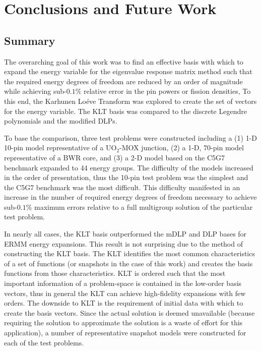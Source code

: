 
\chapter{Conclusions and Future Work} %

\label{Chapter7}



\section{Summary}

The overarching goal of this work was to find an effective basis 
with which to expand the energy variable for the eigenvalue response matrix 
method such that the required energy degrees of freedom are reduced by an order 
of magnitude while achieving sub-$0.1\%$ relative error in the pin powers or 
fission densities,  To this end, the Karhunen Lo\'{e}ve Transform was explored 
to create the set of vectors for the energy variable.  The KLT basis was 
compared to the discrete Legendre polynomials and the modified DLPs.  

To base the comparison, three test problems were constructed including a (1) 1-D 
10-pin model representative of a UO$_2$-MOX junction, (2) a 1-D, 70-pin model 
representative of a BWR core, and (3) a 2-D model based on the C5G7 benchmark 
expanded to 44 energy groups.  The difficulty of the models increased in the 
order of presentation, thus the 10-pin test problem was the simplest and the 
C5G7 benchmark was the most difficult.  This difficulty manifested in an 
increase in the number of required energy degrees of freedom necessary to 
achieve sub-$0.1\%$ maximum errors relative to a full multigroup solution of 
the particular test problem.

In nearly all cases, the KLT basis outperformed the mDLP and DLP bases for ERMM 
energy expansions.  This result is not surprising due to the method of 
constructing the KLT basis.  The KLT identifies the most common characteristics 
of a set of functions (or snapshots in the case of this work) and creates the 
basis functions from those characteristics. KLT is ordered such that the most 
important information of a problem-space is contained in the low-order 
basis vectors, thus in general the KLT can achieve high-fidelity expansions 
with few orders.  The downside to KLT is the requirement of initial data with 
which to create the basis vectors.  Since the actual solution is deemed 
unavailable (because requiring the solution to approximate the solution is a 
waste of effort for this application), a number of representative snapshot 
models were constructed for each of the test problems.  

